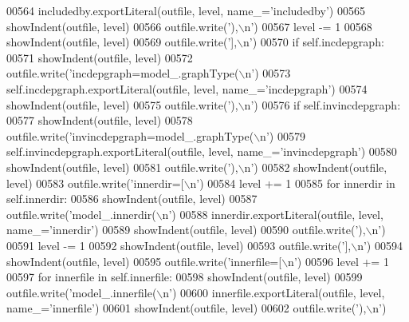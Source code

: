 \begin{DoxyCode}
{{{{{{{{{{{{{{{{{{{{{{{{{{{{{{{{{{{00564             includedby.exportLiteral(outfile, level, name\_=\textcolor{stringliteral}{'includedby'})
00565             showIndent(outfile, level)
00566             outfile.write(\textcolor{stringliteral}{'),\(\backslash\)n'})
00567         level -= 1
00568         showIndent(outfile, level)
00569         outfile.write(\textcolor{stringliteral}{'],\(\backslash\)n'})
00570         \textcolor{keywordflow}{if} self.incdepgraph:
00571             showIndent(outfile, level)
00572             outfile.write(\textcolor{stringliteral}{'incdepgraph=model\_.graphType(\(\backslash\)n'})
00573             self.incdepgraph.exportLiteral(outfile, level, name\_=\textcolor{stringliteral}{'incdepgraph'})
00574             showIndent(outfile, level)
00575             outfile.write(\textcolor{stringliteral}{'),\(\backslash\)n'})
00576         \textcolor{keywordflow}{if} self.invincdepgraph:
00577             showIndent(outfile, level)
00578             outfile.write(\textcolor{stringliteral}{'invincdepgraph=model\_.graphType(\(\backslash\)n'})
00579             self.invincdepgraph.exportLiteral(outfile, level, name\_=\textcolor{stringliteral}{'invincdepgraph'})
00580             showIndent(outfile, level)
00581             outfile.write(\textcolor{stringliteral}{'),\(\backslash\)n'})
00582         showIndent(outfile, level)
00583         outfile.write(\textcolor{stringliteral}{'innerdir=[\(\backslash\)n'})
00584         level += 1
00585         \textcolor{keywordflow}{for} innerdir \textcolor{keywordflow}{in} self.innerdir:
00586             showIndent(outfile, level)
00587             outfile.write(\textcolor{stringliteral}{'model\_.innerdir(\(\backslash\)n'})
00588             innerdir.exportLiteral(outfile, level, name\_=\textcolor{stringliteral}{'innerdir'})
00589             showIndent(outfile, level)
00590             outfile.write(\textcolor{stringliteral}{'),\(\backslash\)n'})
00591         level -= 1
00592         showIndent(outfile, level)
00593         outfile.write(\textcolor{stringliteral}{'],\(\backslash\)n'})
00594         showIndent(outfile, level)
00595         outfile.write(\textcolor{stringliteral}{'innerfile=[\(\backslash\)n'})
00596         level += 1
00597         \textcolor{keywordflow}{for} innerfile \textcolor{keywordflow}{in} self.innerfile:
00598             showIndent(outfile, level)
00599             outfile.write(\textcolor{stringliteral}{'model\_.innerfile(\(\backslash\)n'})
00600             innerfile.exportLiteral(outfile, level, name\_=\textcolor{stringliteral}{'innerfile'})
00601             showIndent(outfile, level)
00602             outfile.write(\textcolor{stringliteral}{'),\(\backslash\)n'})
}}}}}}}}}}}}}}}}}}}}}}}}}}}}}}}}}}}
\end{DoxyCode}
